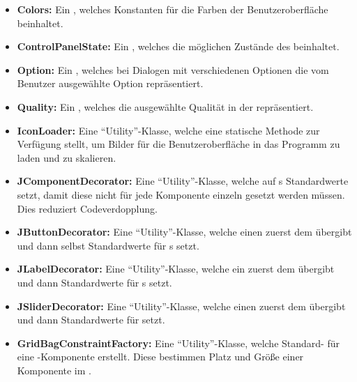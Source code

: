 \begin{itemize}
	\item \textbf{Colors:}
Ein , welches Konstanten für die Farben der Benutzeroberfläche beinhaltet.
	
	\item \textbf{ControlPanelState:} Ein , welches die möglichen Zustände des  beinhaltet.
	
	\item \textbf{Option:} Ein , welches bei Dialogen mit verschiedenen Optionen die vom Benutzer ausgewählte Option repräsentiert.
	
	\item \textbf{Quality:} Ein , welches die ausgewählte Qualität in der  repräsentiert.
	
	\item \textbf{IconLoader:} Eine \enquote{Utility}-Klasse, welche eine statische Methode zur Verfügung stellt, um Bilder für die Benutzeroberfläche in das Programm zu laden und zu skalieren.
	
	\item \textbf{JComponentDecorator:} Eine \enquote{Utility}-Klasse, welche auf s Standardwerte setzt, damit diese nicht für jede Komponente einzeln gesetzt werden müssen. Dies reduziert Codeverdopplung.

	\item \textbf{JButtonDecorator:} Eine \enquote{Utility}-Klasse, welche einen  zuerst dem  übergibt und dann selbst Standardwerte für s setzt.

	\item \textbf{JLabelDecorator:} Eine \enquote{Utility}-Klasse, welche ein  zuerst dem  übergibt und dann Standardwerte für s setzt.

	\item \textbf{JSliderDecorator:} Eine \enquote{Utility}-Klasse, welche einen  zuerst dem  übergibt und dann Standardwerte für  setzt.

	\item \textbf{GridBagConstraintFactory:} Eine \enquote{Utility}-Klasse, welche Standard- für eine -Komponente erstellt. Diese bestimmen Platz und Größe einer Komponente im .

\end{itemize} 

